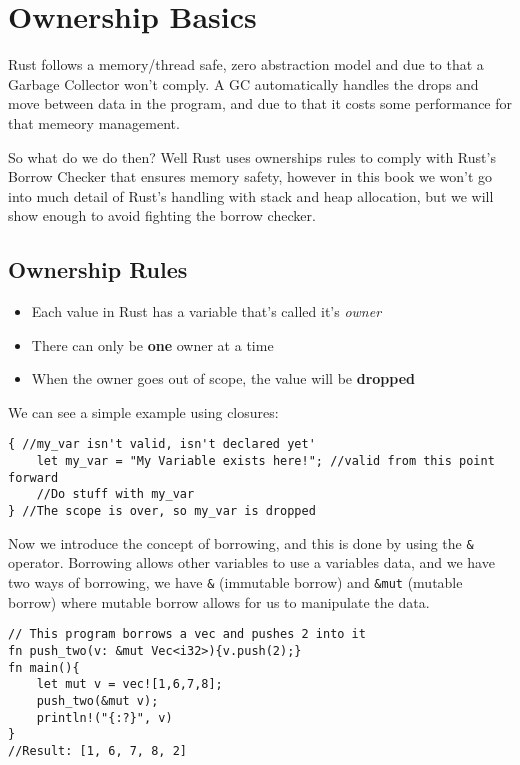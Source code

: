 \chapter{Ownership Basics}
\par Rust follows a memory/thread safe, zero abstraction model and due to that a Garbage Collector won't comply. A GC automatically 
handles the drops and move between data in the program, and due to that it costs some performance for that memeory management. 

So what do we do then? Well Rust uses ownerships rules to comply with Rust's Borrow Checker that ensures memory safety, however
in this book we won't go into much detail of Rust's handling with stack and heap allocation, but we will show enough to avoid 
fighting the borrow checker. 

\section{Ownership Rules}
\begin{itemize}
    \item Each value in Rust has a variable that's called it's \textit{owner}
    \item There can only be \textbf{one} owner at a time
    \item When the owner goes out of scope, the value will be \textbf{dropped}
\end{itemize}

\par We can see a simple example using closures: 
\begin{lstlisting}
{ //my_var isn't valid, isn't declared yet'
    let my_var = "My Variable exists here!"; //valid from this point forward
    //Do stuff with my_var
} //The scope is over, so my_var is dropped    
\end{lstlisting}

\par Now we introduce the concept of borrowing, and this is done by using the \verb!&! operator. Borrowing allows other 
variables to use a variables data, and we have two ways of borrowing, we have \verb!&! (immutable borrow) and \verb!&mut! 
(mutable borrow) where mutable borrow allows for us to manipulate the data. 

\begin{lstlisting}
// This program borrows a vec and pushes 2 into it 
fn push_two(v: &mut Vec<i32>){v.push(2);}
fn main(){
    let mut v = vec![1,6,7,8];
    push_two(&mut v);
    println!("{:?}", v)
}
//Result: [1, 6, 7, 8, 2]    
\end{lstlisting}

